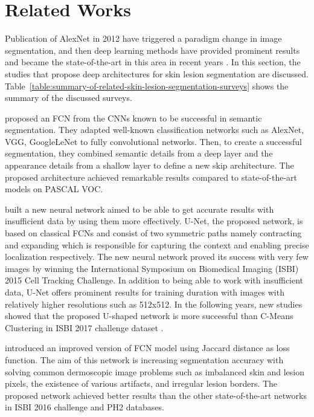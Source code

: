 \section{Related Works}

    Publication of AlexNet in 2012 have triggered a paradigm change in image segmentation, and then
    deep learning methods have provided prominent results and became the state-of-the-art in this area in recent years \cite{quang2017automatic}.
    In this section, the studies that propose deep architectures for skin lesion segmentation are discussed.
    Table~\ref{table:summary-of-related-skin-lesion-segmentation-surveys} shows the summary of the discussed surveys.

    \citet{long2015fully} proposed an FCN from the CNNs known to be successful in semantic segmentation.
    They adapted well-known classification networks such as AlexNet, VGG, GoogleLeNet to fully convolutional networks.
    Then, to create a successful segmentation, they combined semantic details from a deep layer
    and the appearance details from a shallow layer to define a new skip architecture.
    The proposed architecture achieved remarkable results compared to state-of-the-art models on PASCAL VOC.

    \citet{ronneberger2015u} built a new neural network aimed to be able to get accurate results with insufficient data by using them more effectively.
    U-Net, the proposed network, is based on classical FCNs and consist of two symmetric paths
    namely contracting and expanding which is responsible for capturing the context and enabling precise localization respectively.
    The new neural network proved its success with very few images by  winning the International Symposium on Biomedical Imaging (ISBI) 2015 Cell Tracking Challenge.
    In addition to being able to work with insufficient data, U-Net offers prominent results for training duration with images with relatively higher resolutions such as 512x512.
    In the following years, new studies showed that the proposed U-shaped network is more successful than C-Means Clustering in ISBI 2017 challenge dataset \cite{lin2017skin}.

    \citet{yuan2017automatic} introduced an improved version of FCN model using Jaccard distance as loss function.
    The aim of this network is increasing segmentation accuracy with
    solving common dermoscopic image problems such as imbalanced skin and lesion pixels, the existence of various artifacts, and irregular lesion borders.
    The proposed network achieved better results than the other state-of-the-art networks in ISBI 2016 challenge and PH2 databases.

